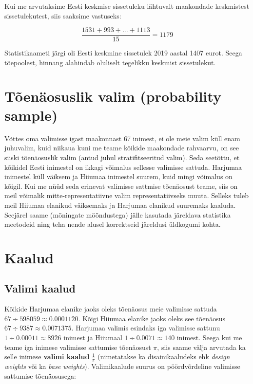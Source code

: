 \documentclass[
]{book}
\begin{document}
Kui me arvutaksime Eesti keskmise sissetuleku lähtuvalt maakondade keskmistest sissetulekutest, siis saaksime vastuseks:

\[\frac{1531 + 993 + ... + 1113}{15} = 1179\]

Statistikaameti järgi oli Eesti keskmine sissetulek 2019 aastal 1407 eurot. Seega tõepoolest, hinnang alahindab oluliselt tegelikku keskmist sissetulekut.

\hypertarget{tuxf5enuxe4osuslik-valim-probability-sample}{%
\section{Tõenäosuslik valim (probability sample)}\label{tuxf5enuxe4osuslik-valim-probability-sample}}

Võttes oma valimisse igast maakonnast 67 inimest, ei ole meie valim küll enam juhuvalim, kuid niikaua kuni me teame kõikide maakondade rahvaarvu, on see siiski tõenäosuslik valim (antud juhul stratifitseeritud valim). Seda seetõttu, et kõikidel Eesti inimestel on ikkagi võimalus sellesse valimisse sattuda. Harjumaa inimestel küll väiksem ja Hiiumaa inimestel suurem, kuid mingi võimalus on kõigil. Kui me nüüd seda erinevat valimisse sattmise tõenäosust teame, siis on meil võimalik mitte-representatiivne valim representatiivseks muuta. Selleks tuleb meil Hiiumaa elanikud väiksemaks ja Harjumaa elanikud suuremaks kaaluda. Seejärel saame (mõningate mööndustega) jälle kasutada järeldava statistika meetodeid ning teha nende alusel korrektseid järeldusi üldkogumi kohta.

\hypertarget{kaalud}{%
\section{Kaalud}\label{kaalud}}

\hypertarget{valimi-kaalud}{%
\subsection{Valimi kaalud}\label{valimi-kaalud}}

Kõikide Harjumaa elanike jaoks oleks tõenäosus meie valimisse sattuda \(67 \div 598059 \approx 0.0001120\). Kõigi Hiiumaa elanike jaoks oleks see tõenäosus \(67 \div 9387 \approx 0.0071375\). Harjumaa valimis esindaks iga valimisse sattunu \(1 \div 0.00011 \approx 8926\) inimest ja Hiiumaal \(1 \div 0.0071 \approx 140\) inimest. Seega kui me teame iga inimese valimisse sattumise tõenäosust \(\pi\), siis saame välja arvutada ka selle inimese \textbf{valimi kaalud} \(\frac{1}{\pi}\) (nimetatakse ka disainikaaludeks ehk \emph{design weights} või ka \emph{base weights}). Valimikaalude suurus on pöördvõrdeline valimisse sattumise tõenäosusega:
\end{document}
